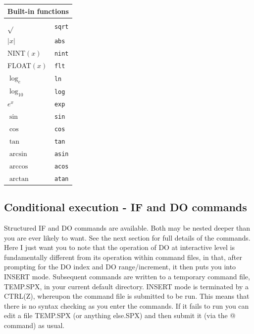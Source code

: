 \documentclass[11pt,twoside]{report}
\begin{document}
\begin{center}
\begin{tabular}{|ll|} \hline
\multicolumn{2}{|c|}{Built-in functions}\\ \hline
$\sqrt{}$   & \verb+sqrt+ \\
$|x|$       & \verb+abs+  \\
NINT$(x)$   & \verb+nint+  \\
FLOAT$(x)$  & \verb+flt+  \\
$\log_e$     & \verb+ln+   \\
$\log_{10}$  & \verb+log+  \\
$e^x$       & \verb+exp+  \\
$\sin$      & \verb+sin+  \\
$\cos$      & \verb+cos+  \\
$\tan$      & \verb+tan+  \\
$\arcsin$   & \verb+asin+  \\
$\arccos$   & \verb+acos+  \\
$\arctan$   & \verb+atan+  \\ \hline
\end{tabular}
\end{center}

\subsection{Conditional execution - IF and DO commands}

Structured IF and DO commands are available. Both may be nested
deeper
than you are ever likely to want. See the next section for full details of the
commands. Here I just want you to note that the operation of DO at
interactive level is fundamentally different from its
operation within command files, in that, after prompting for the DO index and
DO range/increment, it then puts you into INSERT mode. Subsequent commands are
written to a temporary command file, TEMP.SPX, in your current
default directory. INSERT mode is terminated by a CTRL(Z),
whereupon the command file is submitted to be run. This means that there is no
syntax checking as you enter the commands. If it fails to run you can edit a
file TEMP.SPX (or anything else.SPX) and then submit it (via the @ command) as
usual.
\end{document}
